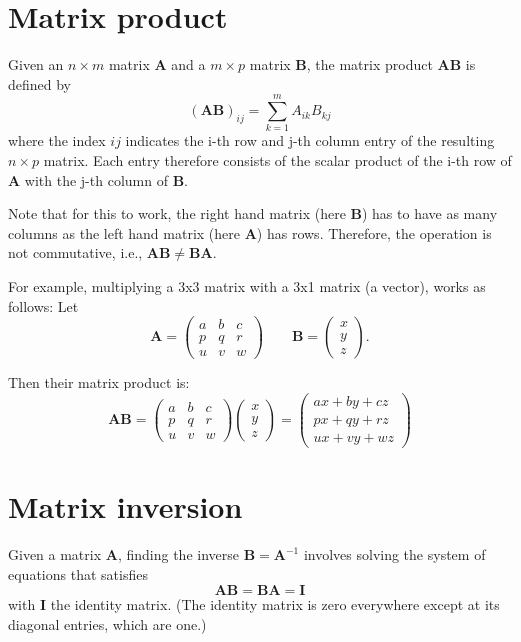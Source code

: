 \section{Matrix product}
Given an $n \times m$ matrix $\mathbf{A}$ and a $m\times p$ matrix $\mathbf{B}$, the matrix product $\mathbf{AB}$ is defined by
\begin{equation}
(\mathbf{AB})_{ij}=\sum_{k=1}^mA_{ik}B_{kj}
\end{equation}
where the index $ij$ indicates the i-th row and j-th column entry of the resulting $n\times p $ matrix. Each entry therefore consists of the scalar product of the i-th row of $\mathbf{A}$ with the j-th column of $\mathbf{B}$.

Note that for this to work, the right hand matrix (here $\mathbf{B}$) has to have as many columns as the left hand matrix (here $\mathbf{A}$) has rows. Therefore, the operation is not commutative, i.e., $\mathbf{AB}\neq\mathbf{BA}$.

For example, multiplying a 3x3 matrix with a 3x1 matrix (a vector), works as follows:
Let
\begin{equation}\nonumber
\mathbf{A} = \begin{pmatrix}
a & b & c \\
p & q & r \\
u & v & w
\end{pmatrix} \qquad \mathbf{B} = \begin{pmatrix}
x \\
y \\
z
\end{pmatrix}.
\end{equation}

Then their matrix product is:
\begin{equation}\nonumber
\mathbf{AB} = \begin{pmatrix}
a & b & c \\
p & q & r \\
u & v & w
\end{pmatrix} \begin{pmatrix}
x \\
y \\
z
\end{pmatrix} =\begin{pmatrix}
ax + by + cz \\
px + qy + rz \\
ux + vy + wz
\end{pmatrix}
\end{equation}

\section{Matrix inversion}
Given a matrix $\mathbf{A}$, finding the inverse $\mathbf{B}=\mathbf{A}^{-1}$ involves solving the system of equations that satisfies
\begin{equation}
\mathbf{AB}=\mathbf{BA}=\mathbf{I}
\end{equation}
with $\mathbf{I}$ the identity matrix. (The identity matrix is zero everywhere except at its diagonal entries, which are one.)

